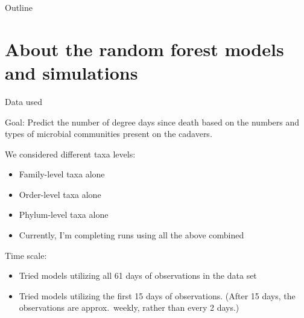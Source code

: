 \documentclass{beamer}
\begin{document}

\begin{frame}{Outline}
  \tableofcontents
\end{frame}








\section[Background]{About the random forest models and simulations}

\begin{frame}{Data used}

{\footnotesize

\noindent Goal: Predict the number of degree days since death based on
the numbers and types of microbial communities present on the cadavers.

\vspace{0.1in}

\noindent We considered different taxa levels:
\begin{itemize}
\item Family-level taxa alone
\item Order-level taxa alone
\item Phylum-level taxa alone
\item Currently, I'm completing runs using all the above combined
\end{itemize}

\vspace{0.1in}

\noindent Time scale:
\begin{itemize}
\item Tried models utilizing all 61 days of observations in the data set
\item Tried models utilizing the first 15 days of observations. (After
  15 days, the observations are approx.~weekly, rather than every 2
  days.)
\end{itemize}
}

\end{frame}
\end{document}
